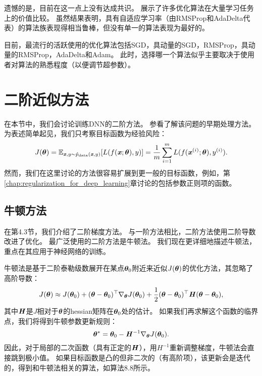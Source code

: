 遗憾的是，目前在这一点上没有达成共识。
\cite{Schaul2014_unittests}展示了许多优化算法在大量学习任务上的价值比较。
虽然结果表明，具有自适应学习率（由RMSProp和AdaDelta代表）的算法族表现得相当鲁棒，但没有单一的算法表现为最好的。

目前，最流行的活跃使用的优化算法包括SGD，具动量的SGD，RMSProp，具动量的RMSProp，AdaDelta和Adam。
此时，选择哪一个算法似乎主要取决于使用者对算法的熟悉程度（以便调节超参数）。

\section{二阶近似方法}
\label{sec:approximate_second_order_methods}
在本节中，我们会讨论训练\gls{DNN}的二阶方法。
参看\cite{lecun1998mnist}了解该问题的早期处理方法。
为表述简单起见，我们只考察目标函数为经验风险：
\begin{equation}
    J(\boldsymbol{\theta}) = \mathbb{E}_{\boldsymbol{\mathit{x}}, y \sim \hat{p}_{\text{data}}(\boldsymbol{\mathit{x}},y) } [ L(f(\boldsymbol{\mathit{x}}; \boldsymbol{\theta}), y) ] =
\frac{1}{m} \sum_{i=1}^m L(f(\boldsymbol{\mathit{x}}^{(i)}; \boldsymbol{\theta}), y^{(i)}).
\end{equation}
然而，我们在这里讨论的方法很容易扩展到更一般的目标函数，例如，第\ref{chap:regularization_for_deep_learning}章讨论的包括参数正则项的函数。


\subsection{牛顿方法}
\label{sec:newton_method}
在第4.3节，我们介绍了二阶梯度方法。
与一阶方法相比，二阶方法使用二阶导数改进了优化。
最广泛使用的二阶方法是牛顿法。
我们现在更详细地描述牛顿法，重点在其应用于神经网络的训练。

牛顿法是基于二阶泰勒级数展开在某点$\boldsymbol{\theta}_0$附近来近似$J(\boldsymbol{\theta})$的优化方法，其忽略了高阶导数：
\begin{equation}
    J(\boldsymbol{\theta}) \approx J(\boldsymbol{\theta}_0) + (\boldsymbol{\theta} - \boldsymbol{\theta}_0)^\top \nabla_{\boldsymbol{\theta}}   
    J(\boldsymbol{\theta}_0) + \frac{1}{2} (\boldsymbol{\theta} - \boldsymbol{\theta}_0)^\top \boldsymbol{\mathit{H}}(\boldsymbol{\theta} - \boldsymbol{\theta}_0),
\end{equation}
其中$\boldsymbol{\mathit{H}}$是$J$相对于$\boldsymbol{\theta}$的\gls{hessian}矩阵在$\boldsymbol{\theta}_0$处的估计。
如果我们再求解这个函数的临界点，我们将得到牛顿参数更新规则：
\begin{equation}
\label{eq:8.27}
    \boldsymbol{\theta}^* = \boldsymbol{\theta}_0 - \boldsymbol{\mathit{H}}^{-1}\nabla_{\boldsymbol{\theta}} J(\boldsymbol{\theta}_0).
\end{equation}
因此，对于局部的二次函数（具有正定的$\boldsymbol{\mathit{H}}$），用$H^{-1}$重新调整梯度，牛顿法会直接跳到极小值。
如果目标函数是凸的但非二次的（有高阶项），该更新会是迭代的，得到和牛顿法相关的算法，如算法8.8所示。


